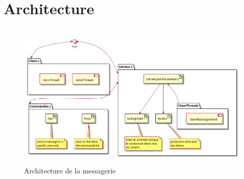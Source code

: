 \documentclass[a4paper,12pt]{article}
\begin{document}
\pagebreak
\section{Architecture}
\begin{figure}[h]
	\centering
	\hrulefill\\
	\includegraphics[width=\linewidth]{architecture.png}
	\caption{Architecture de la messagerie}
	\hrulefill
\end{figure}
\end{document}
